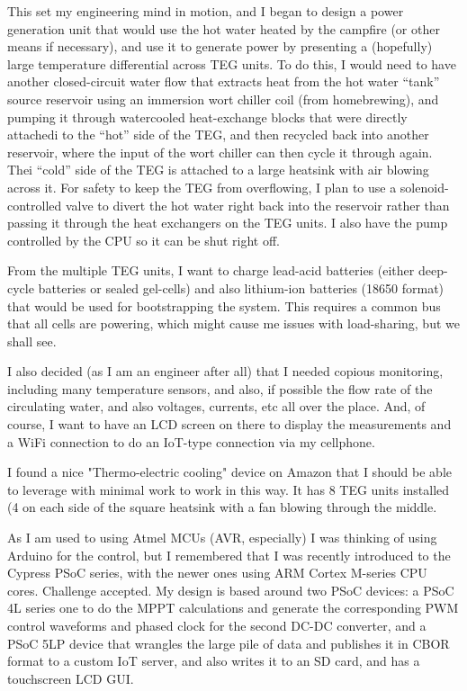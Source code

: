 \documentclass{report}
\begin{document}
This set my engineering mind in motion, and I began to design a power generation
unit that would use the hot water heated by the campfire (or other means if
necessary), and use it to generate power by presenting a (hopefully) large
temperature differential across TEG units.  To do this, I would need to have
another closed-circuit water flow that extracts heat from the hot water ``tank''
source reservoir using an immersion wort chiller coil (from homebrewing), and
pumping it through watercooled heat-exchange blocks that were directly attachedi
to the ``hot'' side of the TEG, and then recycled back into another reservoir,
where the input of the wort chiller can then cycle it through again.  Thei
``cold'' side of the TEG is attached to a large heatsink with air blowing
across it.  For safety to keep the TEG from overflowing, I plan to use a 
solenoid-controlled valve to divert the hot water right back into the reservoir
rather than passing it through the heat exchangers on the TEG units.  I also
have the pump controlled by the CPU so it can be shut right off.

From the multiple TEG units, I want to charge lead-acid batteries (either 
deep-cycle batteries or sealed gel-cells) and also lithium-ion batteries (18650
format) that would be used for bootstrapping the system.  This requires a common
bus that all cells are powering, which might cause me issues with load-sharing,
but we shall see.

I also decided (as I am an engineer after all) that I needed copious monitoring,
including many temperature sensors, and also, if possible the flow rate of the
circulating water, and also voltages, currents, etc all over the place.  And,
of course, I want to have an LCD screen on there to display the measurements
and a WiFi connection to do an IoT-type connection via my cellphone.

I found a nice "Thermo-electric cooling" device on Amazon that I should be able
to leverage with minimal work to work in this way.  It has 8 TEG units
installed (4 on each side of the square heatsink with a fan blowing through
the middle.

As I am used to using Atmel MCUs (AVR, especially) I was thinking of using
Arduino for the control, but I remembered that I was recently introduced to 
the Cypress PSoC series, with the newer ones using ARM Cortex M-series CPU
cores.  Challenge accepted.  My design is based around two PSoC devices: a PSoC
4L series one to do the MPPT calculations and generate the corresponding PWM
control waveforms and phased clock for the second DC-DC converter, and a PSoC
5LP device that wrangles the large pile of data and publishes it in CBOR format
to a custom IoT server, and also writes it to an SD card, and has a touchscreen
LCD GUI.
\end{document}
